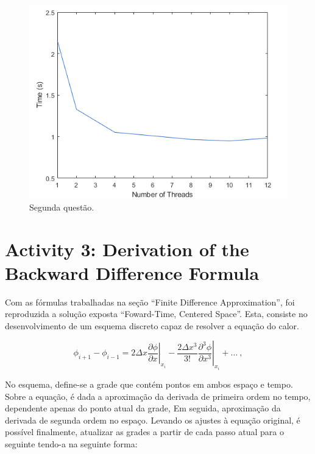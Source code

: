 \documentclass[letterpaper, 10 pt, conference]{ieeeconf}
\begin{document}
\begin{figure}[htbp]
\centering
\includegraphics[width=0.97\columnwidth]{Figuras/img4.png}
\caption{Segunda questão.}
\label{stability}
\end{figure}



\section{Activity 3: Derivation of the Backward Difference Formula}
Com as fórmulas trabalhadas na seção “Finite Difference Approximation”, foi reproduzida a solução exposta “Foward-Time, Centered Space”. Esta, consiste no desenvolvimento de um esquema discreto capaz de resolver a equação do calor.

\begin{equation*} \phi_{i+1}-\phi_{i-1}=2\Delta x\left.\frac{\partial\phi}{\partial x}\right\vert_{x_{i}}-\frac{2\Delta x^{3}}{3!}\left.\frac{\partial^{3}\phi}{\partial x^{3}}\right\vert_{x_{i}}+\ldots\ ,\tag{4} \end{equation*}

No esquema, define-se a grade que contém pontos em ambos espaço e tempo. Sobre a equação, é dada a aproximação da derivada de primeira ordem no tempo, dependente apenas do ponto atual da grade,  Em seguida, aproximação da derivada de segunda ordem no espaço. Levando os ajustes à equação original, é possível finalmente, atualizar as grades a partir de cada passo atual para o seguinte tendo-a na seguinte forma:
\end{document}

